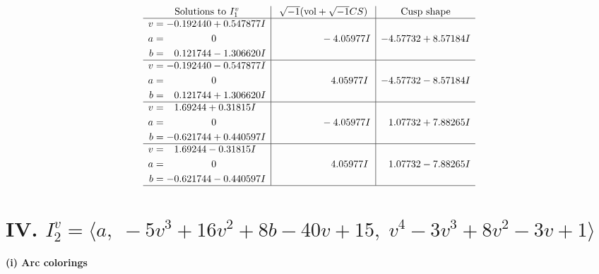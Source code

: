 \documentclass[1p]{elsarticle_modified}
\theoremstyle{definition}
\newcommand{\I}{\sqrt{-1}}
\begin{document}
$$\begin{array}{c|c|c}  
\text{Solutions to }I^v_{1}& \I (\text{vol} + \sqrt{-1}CS) & \text{Cusp shape}\\
 \hline 
\begin{aligned}
v &= -0.192440 + 0.547877 I \\
a &= \phantom{-0.000000 } 0 \\
b &= \phantom{-}0.121744 - 1.306620 I\end{aligned}
 & \phantom{-0.000000 } -4.05977 I & -4.57732 + 8.57184 I \\ \hline\begin{aligned}
v &= -0.192440 - 0.547877 I \\
a &= \phantom{-0.000000 } 0 \\
b &= \phantom{-}0.121744 + 1.306620 I\end{aligned}
 & \phantom{-0.000000 -}4.05977 I & -4.57732 - 8.57184 I \\ \hline\begin{aligned}
v &= \phantom{-}1.69244 + 0.31815 I \\
a &= \phantom{-0.000000 } 0 \\
b &= -0.621744 + 0.440597 I\end{aligned}
 & \phantom{-0.000000 } -4.05977 I & \phantom{-}1.07732 + 7.88265 I \\ \hline\begin{aligned}
v &= \phantom{-}1.69244 - 0.31815 I \\
a &= \phantom{-0.000000 } 0 \\
b &= -0.621744 - 0.440597 I\end{aligned}
 & \phantom{-0.000000 -}4.05977 I & \phantom{-}1.07732 - 7.88265 I\\
 \hline 
 \end{array}$$\newpage\newpage\renewcommand{\arraystretch}{1}
\centering \section*{IV. $I^v_{2}= \langle a,\;-5 v^3+16 v^2+8 b-40 v+15,\;v^4-3 v^3+8 v^2-3 v+1 \rangle$}
\flushleft \textbf{(i) Arc colorings}\\
\end{document}
